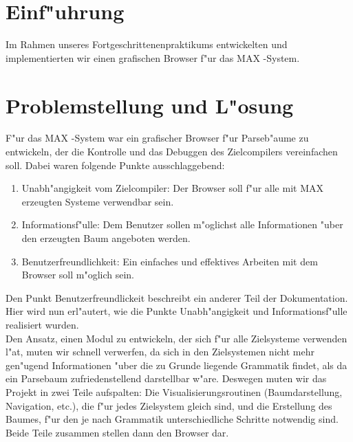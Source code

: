 \newcommand{\MAX}{{\sf MAX }}
\newcommand{\BIM}{{\sf BIM }}

\section{Einf"uhrung}

Im Rahmen unseres Fortgeschrittenenpraktikums entwickelten und implementierten
wir einen grafischen Browser f"ur das \MAX-System.

\section{Problemstellung und L"osung}
F"ur das \MAX-System war ein grafischer Browser f"ur Parseb"aume zu entwickeln,
der die Kontrolle und das Debuggen des Zielcompilers vereinfachen soll. Dabei
waren folgende Punkte ausschlaggebend:\\
\begin{enumerate}
    \item Unabh"angigkeit vom Zielcompiler: Der Browser soll f"ur alle mit
	\MAX erzeugten Systeme verwendbar sein.
    \item Informationsf"ulle: Dem Benutzer sollen m"oglichst alle Informationen
	"uber den erzeugten Baum angeboten werden.
    \item Benutzerfreundlichkeit: Ein einfaches und effektives Arbeiten mit dem
	Browser soll m"oglich sein.
\end{enumerate}

Den Punkt Benutzerfreundlickeit beschreibt ein anderer Teil der Dokumentation. Hier
wird nun erl"autert, wie die Punkte Unabh"angigkeit und Informationsf"ulle realisiert
wurden.\\

Den Ansatz, einen Modul zu entwickeln, der sich f"ur alle Zielsysteme verwenden
l"a\3t, mu\3ten wir schnell verwerfen, da sich in den Zielsystemen nicht mehr
gen"ugend Informationen "uber die zu Grunde liegende Grammatik findet, als da\3
ein Parsebaum zufriedenstellend darstellbar w"are. Deswegen mu\3ten wir das Projekt
in zwei Teile aufspalten: Die Visualisierungsroutinen (Baumdarstellung, Navigation,
etc.), die f"ur jedes Zielsystem gleich sind, und die Erstellung des Baumes, f"ur
den je nach Grammatik unterschiedliche Schritte notwendig sind. Beide Teile zusammen
stellen dann den Browser dar.\\

